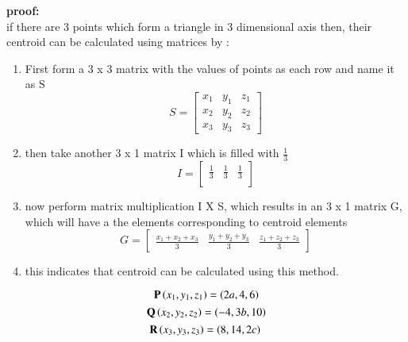 \documentclass[journal]{IEEEtran}
\begin{document}
	\textbf{proof: }\\
	if there are 3 points which form a triangle in 3 dimensional axis then, their centroid can be calculated using matrices by : \\
	\begin{enumerate} [1.]
	    \item First form a 3 x 3 matrix with the values of points as each row and name it as S\\
	             $$ S = \begin{bmatrix}
		                   x_1&y_1&z_1\\
				                 x_2&y_2&z_2\\
						               x_3&y_3&z_3
							                 \end{bmatrix}$$
									     \item then take another 3 x 1 matrix I which is filled with  $\frac{1}{3}$\\
									         $$ I = \begin{bmatrix}
										         \frac{1}{3}&\frac{1}{3}&\frac{1}{3}\\
											     \end{bmatrix}$$
											         \item now perform matrix multiplication I X S, which results in an 3 x 1 matrix G, which will have a the elements corresponding to centroid elements \\
												     $$G= \begin{bmatrix}
												             \frac{x_1+x_2+x_3}{3}&\frac{y_1+y_2+y_3}{3}&\frac{z_1+z_2+z_3}{3}
													         \end{bmatrix}$$
														     \item this indicates that centroid can be calculated using this method.
														        
															\end{enumerate}
															\begin{equation}
															\textbf{P}\left(x_1,y_1,z_1\right) = \left(2a,4,6\right)\label{eq1.12.18.1}
															\end{equation}
															\begin{equation}
															    \textbf{Q}\left(x_2,y_2,z_2\right) = \left(-4,3b,10\right)\label{eq1.12.18.2}
															    \end{equation}
															    \begin{equation}
															        \textbf{R}\left(x_3,y_3,z_3\right) = \left(8,14,2c\right)\label{eq1.12.18.3}\\
																\end{equation}
\end{document}

